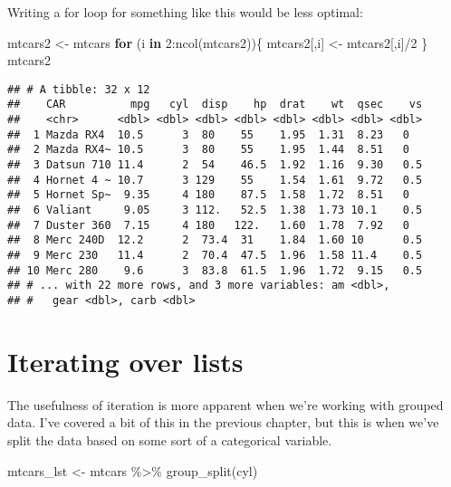 \documentclass[
]{book}
\newenvironment{Shaded}{\begin{snugshade}}{\end{snugshade}}
\newcommand{\ControlFlowTok}[1]{\textcolor[rgb]{0.13,0.29,0.53}{\textbf{#1}}}
\newcommand{\DecValTok}[1]{\textcolor[rgb]{0.00,0.00,0.81}{#1}}
\newcommand{\FunctionTok}[1]{\textcolor[rgb]{0.00,0.00,0.00}{#1}}
\newcommand{\NormalTok}[1]{#1}
\newcommand{\OtherTok}[1]{\textcolor[rgb]{0.56,0.35,0.01}{#1}}
\newcommand{\SpecialCharTok}[1]{\textcolor[rgb]{0.00,0.00,0.00}{#1}}
\begin{document}
Writing a for loop for something like this would be less optimal:

\begin{Shaded}
\begin{Highlighting}[]
\NormalTok{mtcars2 }\OtherTok{\textless{}{-}}\NormalTok{ mtcars}
\ControlFlowTok{for}\NormalTok{ (i }\ControlFlowTok{in} \DecValTok{2}\SpecialCharTok{:}\FunctionTok{ncol}\NormalTok{(mtcars2))\{}
\NormalTok{  mtcars2[,i] }\OtherTok{\textless{}{-}}\NormalTok{ mtcars2[,i]}\SpecialCharTok{/}\DecValTok{2}
\NormalTok{\}}
\NormalTok{mtcars2}
\end{Highlighting}
\end{Shaded}

\begin{verbatim}
## # A tibble: 32 x 12
##    CAR          mpg   cyl  disp    hp  drat    wt  qsec    vs
##    <chr>      <dbl> <dbl> <dbl> <dbl> <dbl> <dbl> <dbl> <dbl>
##  1 Mazda RX4  10.5      3  80    55    1.95  1.31  8.23   0  
##  2 Mazda RX4~ 10.5      3  80    55    1.95  1.44  8.51   0  
##  3 Datsun 710 11.4      2  54    46.5  1.92  1.16  9.30   0.5
##  4 Hornet 4 ~ 10.7      3 129    55    1.54  1.61  9.72   0.5
##  5 Hornet Sp~  9.35     4 180    87.5  1.58  1.72  8.51   0  
##  6 Valiant     9.05     3 112.   52.5  1.38  1.73 10.1    0.5
##  7 Duster 360  7.15     4 180   122.   1.60  1.78  7.92   0  
##  8 Merc 240D  12.2      2  73.4  31    1.84  1.60 10      0.5
##  9 Merc 230   11.4      2  70.4  47.5  1.96  1.58 11.4    0.5
## 10 Merc 280    9.6      3  83.8  61.5  1.96  1.72  9.15   0.5
## # ... with 22 more rows, and 3 more variables: am <dbl>,
## #   gear <dbl>, carb <dbl>
\end{verbatim}

\hypertarget{iterating-over-lists}{%
\section{Iterating over lists}\label{iterating-over-lists}}

The usefulness of iteration is more apparent when we're working with grouped data. I've covered a bit of this in the previous chapter, but this is when we've split the data based on some sort of a categorical variable.

\begin{Shaded}
\begin{Highlighting}[]
\NormalTok{mtcars\_lst }\OtherTok{\textless{}{-}}\NormalTok{ mtcars }\SpecialCharTok{\%\textgreater{}\%} \FunctionTok{group\_split}\NormalTok{(cyl)}
\end{Highlighting}
\end{Shaded}
\end{document}
